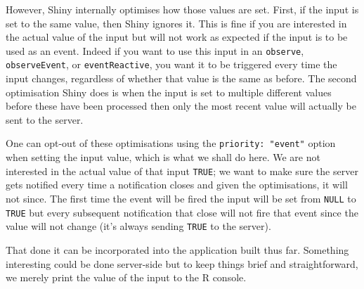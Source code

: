 \documentclass[
]{krantz}
\makeatletter
\newenvironment{Shaded}{\begin{snugshade}}{\end{snugshade}}
\newcommand{\KeywordTok}[1]{\textcolor[rgb]{0.27,0.27,0.27}{\textbf{#1}}}
\newcommand{\NormalTok}[1]{#1}
\newcommand{\OperatorTok}[1]{\textcolor[rgb]{0.43,0.43,0.43}{\textbf{#1}}}
\newcommand{\StringTok}[1]{\textcolor[rgb]{0.5,0.5,0.5}{#1}}
\newenvironment{kframe}{%
\medskip{}
\setlength{\fboxsep}{.8em}
 \def\at@end@of@kframe{}%
 \ifinner\ifhmode%
  \def\at@end@of@kframe{\end{minipage}}%
  \begin{minipage}{\columnwidth}%
 \fi\fi%
 \def\FrameCommand##1{\hskip\@totalleftmargin \hskip-\fboxsep
 \colorbox{shadecolor}{##1}\hskip-\fboxsep
     \hskip-\linewidth \hskip-\@totalleftmargin \hskip\columnwidth}%
 \MakeFramed {\advance\hsize-\width
   \@totalleftmargin\z@ \linewidth\hsize
   \@setminipage}}%
 {\par\unskip\endMakeFramed%
 \at@end@of@kframe}
\renewenvironment{Shaded}{\begin{kframe}}{\end{kframe}}
\makeatother
\begin{document}
However, Shiny internally optimises how those values are set. First, if the input is set to the same value, then Shiny ignores it. This is fine if you are interested in the actual value of the input but will not work as expected if the input is to be used as an event. Indeed if you want to use this input in an \texttt{observe}, \texttt{observeEvent}, or \texttt{eventReactive}, you want it to be triggered every time the input changes, regardless of whether that value is the same as before. The second optimisation Shiny does is when the input is set to multiple different values before these have been processed then only the most recent value will actually be sent to the server.

One can opt-out of these optimisations using the \texttt{priority:\ "event"} option when setting the input value, which is what we shall do here. We are not interested in the actual value of that input \texttt{TRUE}; we want to make sure the server gets notified every time a notification closes and given the optimisations, it will not since. The first time the event will be fired the input will be set from \texttt{NULL} to \texttt{TRUE} but every subsequent notification that close will not fire that event since the value will not change (it's always sending \texttt{TRUE} to the server).

\begin{Shaded}
\end{Shaded}

That done it can be incorporated into the application built thus far. Something interesting could be done server-side but to keep things brief and straightforward, we merely print the value of the input to the R console.
\end{document}
